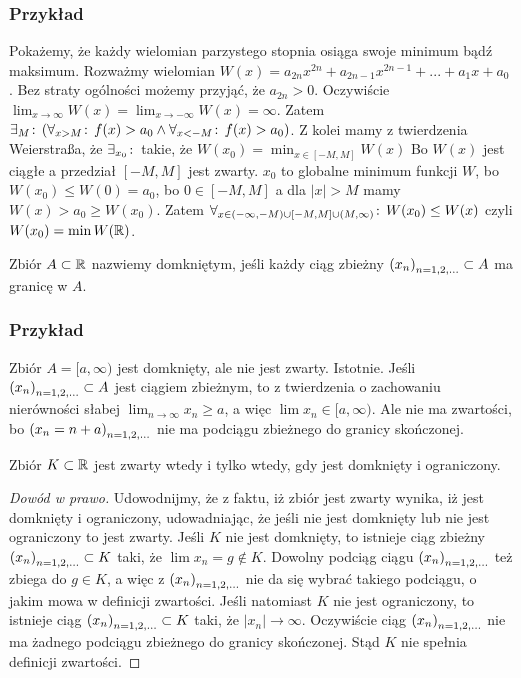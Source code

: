 \documentclass[9pt]{article}
\begin{document}
\subsubsection*{Przykład}

Pokażemy, że każdy wielomian parzystego stopnia osiąga swoje minimum bądź maksimum. Rozważmy
wielomian $W(x) = a_{2n}x^{2n} + a_{2n-1}x^{2n-1} + ... + a_1 x + a_0$. Bez straty ogólności możemy
przyjąć, że $a_{2n} > 0$. Oczywiście $\lim_{x \to \infty} W(x) = \lim_{x \to -\infty} W(x) =
\infty$. Zatem $\exists_{M} \! : \,\left(\forall_{x > M} \! : \, f(x) > a_0 \land \forall_{x < -M} \! : \, f(x) > a_0\right)$. Z kolei mamy
z twierdzenia Weierstraßa, że $\exists_{x_0} \! : \,$ takie, że $W(x_0) = \min_{x \in [-M, M]} W(x)$ Bo $W(x)$
jest ciągłe a przedział $[-M, M]$ jest zwarty. $x_0$ to globalne minimum funkcji $W$, bo
$W(x_0) \le W(0) = a_0$, bo $0 \in [-M, M]$ a dla $|x| > M$ mamy $W(x) > a_0 \ge W(x_0)$. Zatem
$\forall_{x \in (-\infty, -M) \cup [-M, M] \cup (M, \infty)} \! : \, W(x_0) \le W(x)$ czyli $W(x_0) = \min
W(\mathbb{R})$.

\begin{Def}
    Zbiór $A \subset \mathbb{R}$ nazwiemy domkniętym, jeśli każdy ciąg zbieżny $\left(x_n\right)_{n = 1,2,...} \subset A$ ma
    granicę w $A$.
\end{Def}

\subsubsection*{Przykład}

Zbiór $A = [a, \infty)$ jest domknięty, ale nie jest zwarty. Istotnie. Jeśli $\left(x_n\right)_{n = 1,2,...} \subset A$
jest ciągiem zbieżnym, to z twierdzenia o zachowaniu nierówności słabej
$\lim_{n \to \infty} x_n \ge a$, a więc $\lim x_n \in [a, \infty)$. Ale nie ma zwartości, bo
$\left(x_n = n+a\right)_{n = 1,2,...}$ nie ma podciągu zbieżnego do granicy skończonej.

\begin{Twi}
    Zbiór $K \subset \mathbb{R}$ jest zwarty wtedy i tylko wtedy, gdy jest domknięty i ograniczony.
\end{Twi}

\begin{proof}[Dowód w prawo]
    Udowodnijmy, że z faktu, iż zbiór jest zwarty wynika, iż jest domknięty i ograniczony,
    udowadniając, że jeśli nie jest domknięty lub nie jest ograniczony to jest zwarty. Jeśli $K$ nie
    jest domknięty, to istnieje ciąg zbieżny $\left(x_n\right)_{n = 1,2,...} \subset K$ taki, że $\lim x_n = g \notin K$.
    Dowolny podciąg ciągu $\left(x_n\right)_{n = 1,2,...}$ też zbiega do $g \in K$, a więc z $\left(x_n\right)_{n = 1,2,...}$ nie da się
    wybrać takiego podciągu, o jakim mowa w definicji zwartości. Jeśli natomiast $K$ nie jest
    ograniczony, to istnieje ciąg $\left(x_n\right)_{n = 1,2,...} \subset K$ taki, że $|x_n| \to \infty$. Oczywiście ciąg
    $\left(x_n\right)_{n = 1,2,...}$ nie ma żadnego podciągu zbieżnego do granicy skończonej. Stąd $K$ nie spełnia
    definicji zwartości.
\end{proof}
\end{document}
